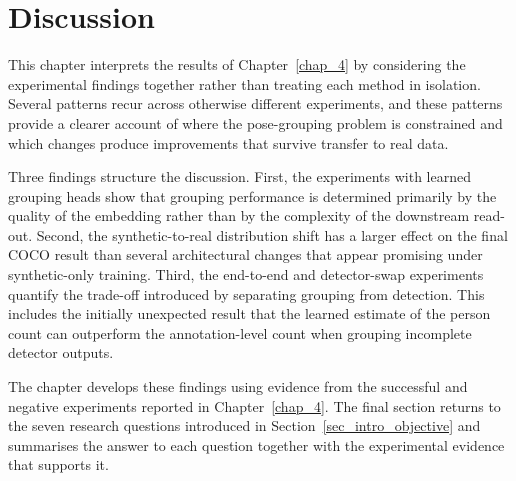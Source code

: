 
\chapter{Discussion}
\label{chap_5}

This chapter interprets the results of Chapter~\ref{chap_4} by
considering the experimental findings together
rather than treating each method in isolation.
Several patterns recur across otherwise different experiments,
and these patterns provide a clearer account of where the pose-grouping
problem is constrained
and which changes produce improvements that survive transfer to real data.

Three findings structure the discussion.
First, the experiments with learned grouping heads show that grouping
performance is determined primarily by the quality of the embedding
rather than by the complexity of the downstream read-out.
Second, the synthetic-to-real distribution shift has a larger effect
on the final COCO result than several architectural changes that appear
promising under synthetic-only training.
Third, the end-to-end and detector-swap experiments quantify the
trade-off introduced by separating grouping from detection.
This includes the initially unexpected result that the learned estimate
of the person count can outperform the annotation-level count when
grouping incomplete detector outputs.

The chapter develops these findings using evidence from the successful
and negative experiments reported in Chapter~\ref{chap_4}.
The final section returns to the seven research questions introduced
in Section~\ref{sec_intro_objective}
and summarises the answer to each question together with the
experimental evidence that supports it.






